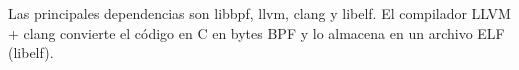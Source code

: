 Las principales dependencias son libbpf, llvm, clang y libelf. El compilador LLVM + clang convierte el código en C en bytes BPF y lo almacena en un archivo ELF (libelf).